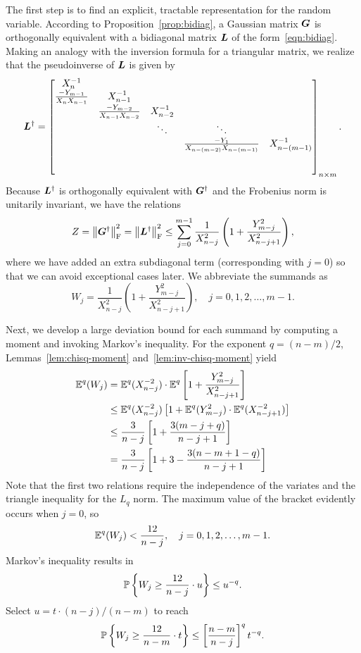 \documentclass[final]{siamltex}
\begin{document}
\begin{appendix}
The first step is to find an explicit, tractable representation for
the random variable. According to Proposition~\ref{prop:bidiag}, a
Gaussian matrix $\mtx{G}$ is orthogonally equivalent with a
bidiagonal matrix $\mtx{L}$ of the form~\eqref{eqn:bidiag}.
Making an analogy with the inversion formula for a %
triangular matrix, we realize that the pseudoinverse of $\mtx{L}$ is given by
$$
\mtx{L}^{\psinv} =
\begin{bmatrix}
X_n^{-1} \\
\frac{-Y_{m-1}}{X_n X_{n-1}} & X_{n-1}^{-1} \\
& \frac{-Y_{m-2}}{X_{n-1} X_{n-2}} & X_{n-2}^{-1} \\
&& \ddots & \ddots \\
&&& \frac{-Y_1}{X_{n-(m-2)} X_{n-(m-1)}} & X_{n-(m-1)}^{-1} \\
\\ \\
\end{bmatrix}_{n \times m}.
$$
Because $\mtx{L}^\psinv$ is orthogonally equivalent with $\mtx{G}^\psinv$
and the Frobenius norm is unitarily invariant, we have the relations
$$
Z = \smnorm{\rm F}{ \mtx{G}^\psinv }^2
    = \smnorm{\rm F}{ \mtx{L}^{\psinv} }^2
    \leq \sum_{j=0}^{m-1} \frac{1}{X_{n-j}^2}
        \left( 1 + \frac{Y_{m-j}^2}{X_{n-j+1}^2}\right),
$$
where we have added an extra subdiagonal term (corresponding with $j=0$) so that
we can avoid exceptional cases later.  We abbreviate the summands as
$$
W_j = \frac{1}{X_{n-j}^2} \left( 1 + \frac{Y_{m-j}^2}{X_{n-j+1}^2}\right),
\quad j = 0, 1, 2, \dots, m - 1.
$$

Next, we develop a large deviation bound for each summand by computing a moment
and invoking Markov's inequality.  For the exponent $q = (n-m)/2$,
Lemmas~\ref{lem:chisq-moment} and~\ref{lem:inv-chisq-moment} yield
\begin{align*}
\Expect^q (W_j)
    &= \Expect^q(X_{n-j}^{-2}) \cdot \Expect^q\left[1+ \frac{Y_{m-j}^2}{X_{n-j+1}^2}\right] \\
    &\leq \Expect^q(X_{n-j}^{-2}) \left[1
        + \Expect^q (Y_{m-j}^2) \cdot \Expect^q(X_{n-j+1}^{-2}) \right] \\
    &\leq \frac{3}{n-j} \left[ 1 + \frac{3(m-j+q)}{n-j+1} \right] \\
    &= \frac{3}{n-j} \left[1 + 3 - \frac{3(n-m+1-q)}{n-j+1}\right]
\end{align*}
Note that the first two relations require the independence of the variates
and the triangle inequality for the $L_q$ norm.
The maximum value of the bracket evidently occurs when $j = 0$, so
$$
\Expect^q(W_j) < \frac{12}{n - j},
\quad j = 0, 1, 2, \dots, m-1.
$$
Markov's inequality results in
$$
\Prob{ W_j \geq \frac{12}{n - j}  \cdot u } \leq u^{-q}.
$$
Select $u = t \cdot (n-j)/(n-m)$ to reach
$$
\Prob{ W_j \geq \frac{12}{n - m}  \cdot t }
    \leq \left[ \frac{n-m}{n-j} \right]^{q} t^{-q}.
$$


\end{appendix}
\end{document}
